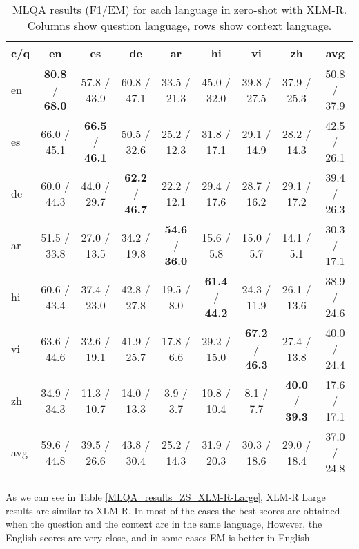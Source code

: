 \documentclass[11pt]{article}
\begin{document}
\begin{table*}[ht]
    \centering
    \begin{adjustbox}{max width=\textwidth}
    \begin{tabular}{l|ccccccc|c}
    \toprule
        c/q & en & es & de & ar & hi & vi & zh & avg \\ \midrule
        en & \textbf{80.8} / \textbf{68.0} & 57.8 / 43.9 & 60.8 / 47.1 & 33.5 / 21.3 & 45.0 / 32.0 & 39.8 / 27.5 & 37.9 / 25.3 & 50.8 / 37.9 \\ 
        es & 66.0 / 45.1 & \textbf{66.5} / \textbf{46.1} & 50.5 / 32.6 & 25.2 / 12.3 & 31.8 / 17.1 & 29.1 / 14.9 & 28.2 / 14.3 & 42.5 / 26.1 \\ 
        de & 60.0 / 44.3 & 44.0 / 29.7 & \textbf{62.2} / \textbf{46.7} & 22.2 / 12.1 & 29.4 / 17.6 & 28.7 / 16.2 & 29.1 / 17.2 & 39.4 / 26.3 \\ 
        ar & 51.5 / 33.8 & 27.0 / 13.5 & 34.2 / 19.8 & \textbf{54.6} / \textbf{36.0} & 15.6 / 5.8 & 15.0 / 5.7 & 14.1 / 5.1 & 30.3 / 17.1 \\ 
        hi & 60.6 / 43.4 & 37.4 / 23.0 & 42.8 / 27.8 & 19.5 / 8.0 & \textbf{61.4} / \textbf{44.2} & 24.3 / 11.9 & 26.1 / 13.6 & 38.9 / 24.6 \\ 
        vi & 63.6 / 44.6 & 32.6 / 19.1 & 41.9 / 25.7 & 17.8 / 6.6 & 29.2 / 15.0 & \textbf{67.2} / \textbf{46.3} & 27.4 / 13.8 & 40.0 / 24.4 \\ 
        zh & 34.9 / 34.3 & 11.3 / 10.7 & 14.0 / 13.3 & 3.9 / 3.7 & 10.8 / 10.4 & 8.1 / 7.7 & \textbf{40.0} / \textbf{39.3} & 17.6 / 17.1 \\ \midrule
        avg & 59.6 / 44.8 & 39.5 / 26.6 & 43.8 / 30.4 & 25.2 / 14.3 & 31.9 / 20.3 & 30.3 / 18.6 & 29.0 / 18.4 & 37.0 / 24.8 \\ \bottomrule
    \end{tabular}
    \end{adjustbox}
    \caption{MLQA results (F1/EM) for each language in zero-shot with XLM-R. Columns show question language, rows show context language.}
    \label{MLQA_results_ZS_XLM-R}
\end{table*}

As we can see in Table \ref{MLQA_results_ZS_XLM-R-Large}, XLM-R Large results are similar to XLM-R. In most of the cases the best scores are obtained when the question and the context are in the same language, However, the English scores are very close, and in some cases EM is better in English.
\end{document}
